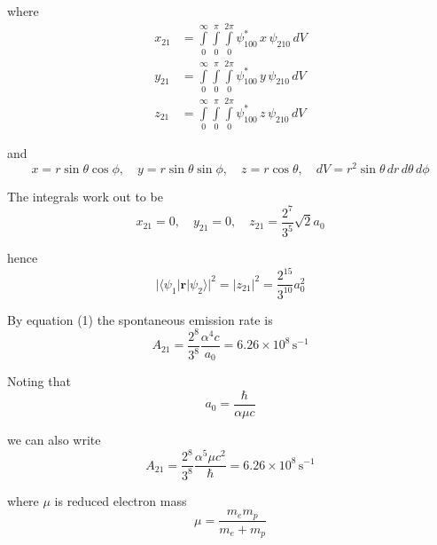where
\begin{align*}
x_{21}&=\int\limits_{0}^{\infty}\int\limits_{0}^{\pi}\int\limits_{0}^{2\pi}
\psi_{100}^*\,x\,\psi_{210}\,dV
\\
y_{21}&=\int\limits_{0}^{\infty}\int\limits_{0}^{\pi}\int\limits_{0}^{2\pi}
\psi_{100}^*\,y\,\psi_{210}\,dV
\\
z_{21}&=\int\limits_{0}^{\infty}\int\limits_{0}^{\pi}\int\limits_{0}^{2\pi}
\psi_{100}^*\,z\,\psi_{210}\,dV
\end{align*}

and
\begin{equation*}
x=r\sin\theta\cos\phi,
\quad
y=r\sin\theta\sin\phi,
\quad
z=r\cos\theta,
\quad
dV=r^2\sin\theta\,dr\,d\theta\,d\phi
\end{equation*}

The integrals work out to be
\begin{equation*}
x_{21}=0,
\quad
y_{21}=0,
\quad
z_{21}=\frac{2^7}{3^5}\sqrt2a_0
\end{equation*}

hence
\begin{equation*}
\bigl|\langle\psi_1|\mathbf r|\psi_2\rangle\bigr|^2=|z_{21}|^2=\frac{2^{15}}{3^{10}}a_0^2
\end{equation*}

By equation (1) the spontaneous emission rate is
\begin{equation*}
A_{21}=\frac{2^8}{3^8}\frac{\alpha^4c}{a_0}=6.26\times10^8\,\text{s}^{-1}
\end{equation*}

Noting that
\begin{equation*}
a_0=\frac{\hbar}{\alpha\mu c}
\end{equation*}

we can also write
\begin{equation*}
A_{21}=\frac{2^8}{3^8}\frac{\alpha^5\mu c^2}{\hbar}=6.26\times10^8\,\text{s}^{-1}
\end{equation*}

where $\mu$ is reduced electron mass
\begin{equation*}
\mu=\frac{m_em_p}{m_e+m_p}
\end{equation*}


